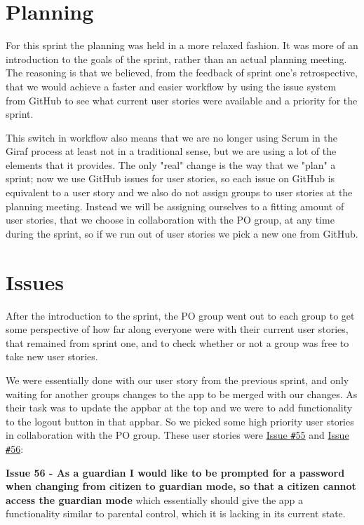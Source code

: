 \section{Planning}\label{sprint2Planning}
For this sprint the planning was held in a more relaxed fashion.
It was more of an introduction to the goals of the sprint, rather than an actual planning meeting.
The reasoning is that we believed, from the feedback of sprint one's retrospective, that we would achieve a faster and easier workflow by using the issue system from GitHub to see what current user stories were available and a priority for the sprint.

This switch in workflow also means that we are no longer using Scrum in the Giraf process at least not in a traditional sense, but we are using a lot of the elements that it provides.
The only "real" change is the way that we "plan" a sprint; now we use GitHub issues for user stories, so each issue on GitHub is equivalent to a user story and we also do not assign groups to user stories at the planning meeting.
Instead we will be assigning ourselves to a fitting amount of user stories, that we choose in collaboration with the PO group, at any time during the sprint, so if we run out of user stories we pick a new one from GitHub.

\section{Issues}\label{sprint2planstories}
After the introduction to the sprint, the PO group went out to each group to get some perspective of how far along everyone were with their current user stories, that remained from sprint one, and to check whether or not a group was free to take new user stories.

We were essentially done with our user story from the previous sprint, and only waiting for another groups changes to the app to be merged with our changes.
As their task was to update the appbar at the top and we were to add functionality to the logout button in that appbar.
So we picked some high priority user stories in collaboration with the PO group.
These user stories were \href{https://github.com/aau-giraf/wiki/issues/55}{Issue \texttt{\#}55} and \href{https://github.com/aau-giraf/wiki/issues/56}{Issue \texttt{\#}56}:

\textbf{Issue 56 - As a guardian I would like to be prompted for a password when changing from citizen to guardian mode, so that a citizen cannot access the guardian mode} which essentially should give the app a functionality similar to parental control, which it is lacking in its current state.

